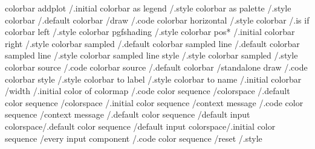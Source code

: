 colorbar addplot                                    /.initial                
colorbar as legend                                  /.style                  
colorbar as palette                                 /.style                  
colorbar                                            /.default                
colorbar                   /draw                    /.code
colorbar horizontal                                 /.style                  
colorbar                                            /.is if                  
colorbar left                                       /.style                  
colorbar pgfshading                                 /.style                  
colorbar pos*                                       /.initial                
colorbar right                                      /.style                  
colorbar sampled                                    /.default                
colorbar sampled line                               /.default                
colorbar sampled line                               /.style                  
colorbar sampled line style                         /.style                  
colorbar sampled                                    /.style                  
colorbar source                                     /.code                   
colorbar source                                     /.default                
colorbar                   /standalone draw         /.code
colorbar style                                      /.style                  
colorbar to label                                   /.style                  
colorbar to name                                    /.initial                
colorbar                   /width                   /.initial
color of colormap                                   /.code                   
color sequence             /colorspace              /.default
color sequence             /colorspace              /.initial
color sequence             /context message         /.code
color sequence             /context message         /.default
color sequence             /default input colorspace/.default
color sequence             /default input colorspace/.initial
color sequence             /every input component   /.code
color sequence             /reset                   /.style

